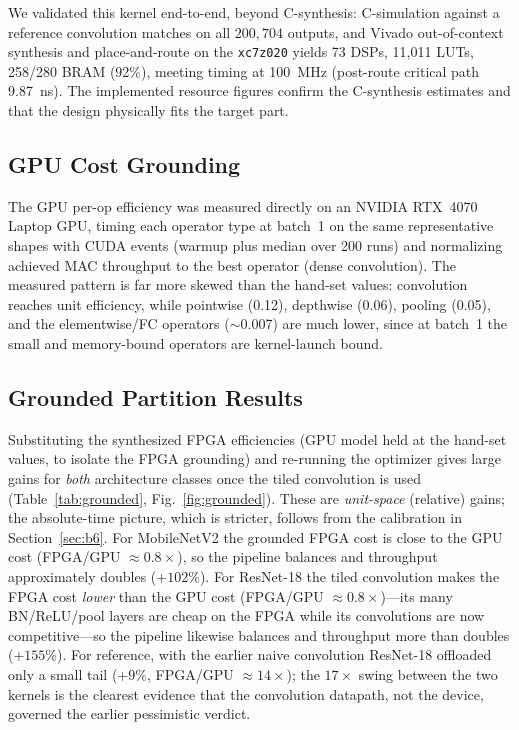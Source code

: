 \documentclass[runningheads]{llncs}
\begin{document}
We validated this kernel end-to-end, beyond C-synthesis: C-simulation against a reference convolution matches on all $200{,}704$ outputs, and Vivado out-of-context synthesis and place-and-route on the \texttt{xc7z020} yields 73 DSPs, 11{,}011 LUTs, 258/280 BRAM (92\%), meeting timing at 100~MHz (post-route critical path 9.87~ns). The implemented resource figures confirm the C-synthesis estimates and that the design physically fits the target part.

\subsection{GPU Cost Grounding}\label{sec:gpu}

The GPU per-op efficiency was measured directly on an NVIDIA RTX~4070 Laptop GPU, timing each operator type at batch~1 on the same representative shapes with CUDA events (warmup plus median over 200 runs) and normalizing achieved MAC throughput to the best operator (dense convolution). The measured pattern is far more skewed than the hand-set values: convolution reaches unit efficiency, while pointwise (0.12), depthwise (0.06), pooling (0.05), and the elementwise/FC operators ($\sim$0.007) are much lower, since at batch~1 the small and memory-bound operators are kernel-launch bound.

\subsection{Grounded Partition Results}\label{sec:grounded_results}

Substituting the synthesized FPGA efficiencies (GPU model held at the hand-set values, to isolate the FPGA grounding) and re-running the optimizer gives large gains for \emph{both} architecture classes once the tiled convolution is used (Table~\ref{tab:grounded}, Fig.~\ref{fig:grounded}). These are \emph{unit-space} (relative) gains; the absolute-time picture, which is stricter, follows from the calibration in Section~\ref{sec:b6}. For MobileNetV2 the grounded FPGA cost is close to the GPU cost (FPGA/GPU $\approx 0.8\times$), so the pipeline balances and throughput approximately doubles ($+102\%$). For ResNet-18 the tiled convolution makes the FPGA cost \emph{lower} than the GPU cost (FPGA/GPU $\approx 0.8\times$)---its many BN/ReLU/pool layers are cheap on the FPGA while its convolutions are now competitive---so the pipeline likewise balances and throughput more than doubles ($+155\%$). For reference, with the earlier naive convolution ResNet-18 offloaded only a small tail ($+9\%$, FPGA/GPU $\approx 14\times$); the $17\times$ swing between the two kernels is the clearest evidence that the convolution datapath, not the device, governed the earlier pessimistic verdict.
\end{document}
